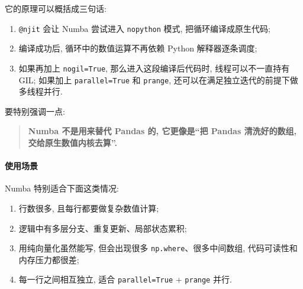 \documentclass[11pt]{article}
\providecommand{\tightlist}{%
      \setlength{\itemsep}{0pt}\setlength{\parskip}{0pt}}
\begin{document}
它的原理可以概括成三句话:

\begin{enumerate}
\def\labelenumi{\arabic{enumi}.}
\tightlist
\item
  \texttt{@njit} 会让 Numba 尝试进入 \texttt{nopython} 模式,
  把循环编译成原生代码;
\item
  编译成功后, 循环中的数值运算不再依赖 Python 解释器逐条调度;
\item
  如果再加上 \texttt{nogil=True}, 那么进入这段编译后代码时,
  线程可以不一直持有 GIL; 如果加上 \texttt{parallel=True} 和
  \texttt{prange}, 还可以在满足独立迭代的前提下做多线程并行.
\end{enumerate}

要特别强调一点:

\begin{quote}
\textbf{Numba 不是用来替代 Pandas 的, 它更像是``把 Pandas 清洗好的数组,
交给原生数值内核去算''.}
\end{quote}

    \paragraph{使用场景}\label{ux4f7fux7528ux573aux666f}

    Numba 特别适合下面这类情况:

\begin{enumerate}
\def\labelenumi{\arabic{enumi}.}
\tightlist
\item
  行数很多, 且每行都要做复杂数值计算;
\item
  逻辑中有多层分支、重复更新、局部状态累积;
\item
  用纯向量化虽然能写, 但会出现很多 \texttt{np.where}、很多中间数组,
  代码可读性和内存压力都很差;
\item
  每一行之间相互独立, 适合 \texttt{parallel=True} + \texttt{prange}
  并行.
\end{enumerate}
\end{document}
